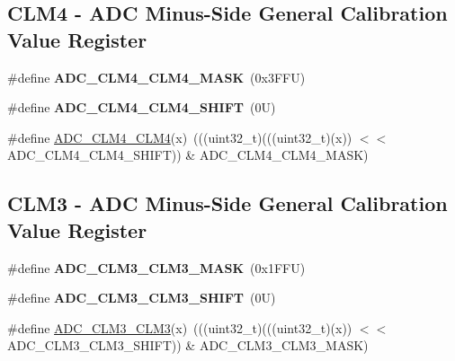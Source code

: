 \subsection*{C\+L\+M4 -\/ A\+DC Minus-\/\+Side General Calibration Value Register}
\begin{DoxyCompactItemize}
\item 
\mbox{\label{group___a_d_c___register___masks_ga9f8f5b63268c5b87f04ee884579a385b}} 
\#define {\bfseries A\+D\+C\+\_\+\+C\+L\+M4\+\_\+\+C\+L\+M4\+\_\+\+M\+A\+SK}~(0x3\+F\+F\+U)
\item 
\mbox{\label{group___a_d_c___register___masks_gafa9121fc54ce9386fdc4c1d05f45d0de}} 
\#define {\bfseries A\+D\+C\+\_\+\+C\+L\+M4\+\_\+\+C\+L\+M4\+\_\+\+S\+H\+I\+FT}~(0\+U)
\item 
\#define \mbox{\hyperlink{group___a_d_c___register___masks_gad44edd7b22b26259838f02e5348e2449}{A\+D\+C\+\_\+\+C\+L\+M4\+\_\+\+C\+L\+M4}}(x)~(((uint32\+\_\+t)(((uint32\+\_\+t)(x)) $<$$<$ A\+D\+C\+\_\+\+C\+L\+M4\+\_\+\+C\+L\+M4\+\_\+\+S\+H\+I\+FT)) \& A\+D\+C\+\_\+\+C\+L\+M4\+\_\+\+C\+L\+M4\+\_\+\+M\+A\+SK)
\end{DoxyCompactItemize}
\subsection*{C\+L\+M3 -\/ A\+DC Minus-\/\+Side General Calibration Value Register}
\begin{DoxyCompactItemize}
\item 
\mbox{\label{group___a_d_c___register___masks_ga546b5a27d980deed324add231c050a6f}} 
\#define {\bfseries A\+D\+C\+\_\+\+C\+L\+M3\+\_\+\+C\+L\+M3\+\_\+\+M\+A\+SK}~(0x1\+F\+F\+U)
\item 
\mbox{\label{group___a_d_c___register___masks_ga9bdd0a97bea9576ea5c9eccd54c08940}} 
\#define {\bfseries A\+D\+C\+\_\+\+C\+L\+M3\+\_\+\+C\+L\+M3\+\_\+\+S\+H\+I\+FT}~(0\+U)
\item 
\#define \mbox{\hyperlink{group___a_d_c___register___masks_gaccf9cd66317e1c61f7daacabd0d95904}{A\+D\+C\+\_\+\+C\+L\+M3\+\_\+\+C\+L\+M3}}(x)~(((uint32\+\_\+t)(((uint32\+\_\+t)(x)) $<$$<$ A\+D\+C\+\_\+\+C\+L\+M3\+\_\+\+C\+L\+M3\+\_\+\+S\+H\+I\+FT)) \& A\+D\+C\+\_\+\+C\+L\+M3\+\_\+\+C\+L\+M3\+\_\+\+M\+A\+SK)
\end{DoxyCompactItemize}
